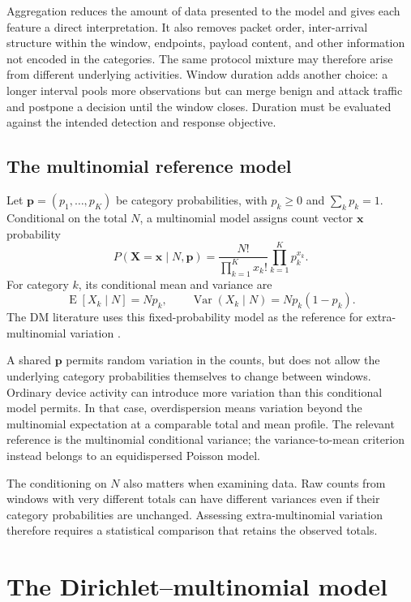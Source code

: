 Aggregation reduces the amount of data presented to the model and gives
each feature a direct interpretation. It also removes packet order,
inter-arrival structure within the window, endpoints, payload content, and
other information not encoded in the categories. The same protocol mixture
may therefore arise from different underlying activities. Window duration
adds another choice: a longer interval pools more observations but can
merge benign and attack traffic and postpone a decision until the window
closes. Duration must be evaluated against the intended detection and
response objective.

\subsection{The multinomial reference model}

Let $\boldsymbol{p}=(p_1,\ldots,p_K)$ be category probabilities, with
$p_k\geq 0$ and $\sum_k p_k=1$. Conditional on the total $N$, a multinomial
model assigns count vector $\boldsymbol{x}$ probability
\[
  P(\boldsymbol{X}=\boldsymbol{x}\mid N,\boldsymbol{p})
  =\frac{N!}{\prod_{k=1}^{K}x_k!}
   \prod_{k=1}^{K}p_k^{x_k}.
\]
For category $k$, its conditional mean and variance are
\[
  \operatorname{E}[X_k\mid N]=Np_k,
  \qquad
  \operatorname{Var}(X_k\mid N)=Np_k(1-p_k).
\]
The DM literature uses this fixed-probability model as the reference for
extra-multinomial variation \cite{yu2014,alhajbaddar2025analysis}.

A shared $\boldsymbol{p}$ permits random variation in the counts, but does
not allow the underlying category probabilities themselves to change
between windows. Ordinary device activity can introduce more variation
than this conditional model permits. In that case, overdispersion means
variation beyond the multinomial expectation at a comparable total and
mean profile. The relevant reference is the multinomial conditional
variance; the variance-to-mean criterion instead belongs to an equidispersed
Poisson model.

The conditioning on $N$ also matters when examining data. Raw counts from
windows with very different totals can have different variances even if
their category probabilities are unchanged. Assessing extra-multinomial
variation therefore requires a statistical comparison that retains the
observed totals.

\section{The Dirichlet--multinomial model}
\label{sec:background-dm}

